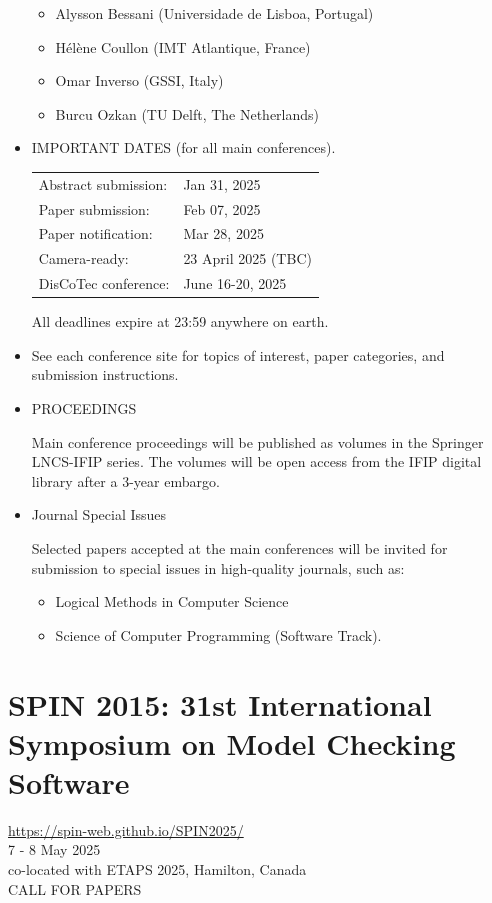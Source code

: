 \documentclass[prodmode,acmtecs]{acmsmall} %
\begin{document}
\begin{itemize}
\begin{itemize}\item  Alysson Bessani (Universidade de Lisboa, Portugal)
\item  Hélène Coullon (IMT Atlantique, France)
\item  Omar Inverso (GSSI, Italy)
\item  Burcu Ozkan (TU Delft, The Netherlands)
\end{itemize} 
\item  IMPORTANT DATES (for all main conferences).  
 
\begin{tabulary}{\linewidth}{LL}Abstract submission:  & Jan 31, 2025 \\
Paper submission:  & Feb 07, 2025 \\
Paper notification:  & Mar 28, 2025 \\
Camera-ready:  & 23 April 2025 (TBC) \\
DisCoTec conference:  & June 16-20, 2025 \\
\end{tabulary}
 
 All deadlines expire at 23:59 anywhere on earth. 
 
\item    See each conference site for topics of interest, paper categories, and submission instructions. 
 
\item  PROCEEDINGS  
 
  Main conference proceedings will be published as volumes in the Springer LNCS-IFIP series. The volumes will be open access from the IFIP digital library after a 3-year embargo. 
 
\item  Journal Special Issues 
 
  Selected papers accepted at the main conferences will be invited for submission to special issues in high-quality journals, such as: 
 
\begin{itemize}\item  Logical Methods in Computer Science
\item  Science of Computer Programming (Software Track).
\end{itemize} 
\end{itemize}\section{SPIN 2015: 31st International Symposium on Model Checking Software}\label{SPIN2015}  \href{https://spin-web.github.io/SPIN2025/}{https://spin-web.github.io/SPIN2025/}\\ 
  7 - 8 May 2025\\ 
  co-located with ETAPS 2025, Hamilton, Canada\\ 
CALL FOR PAPERS 
\end{document}
